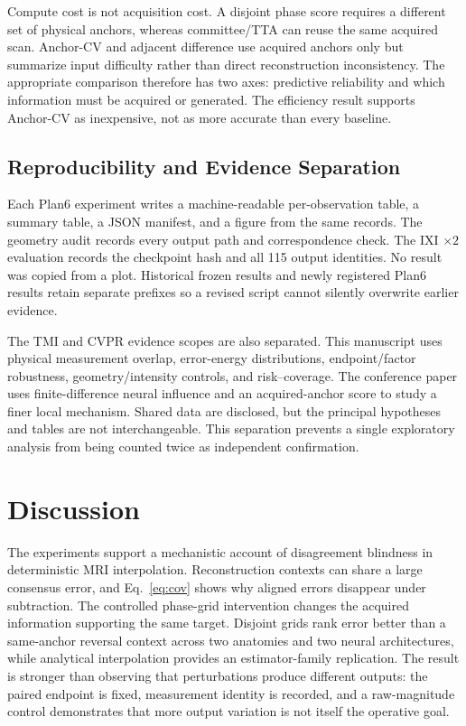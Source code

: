 \documentclass[journal,10pt]{IEEEtran}
\begin{document}
Compute cost is not acquisition cost. A disjoint phase score requires a different set of physical anchors, whereas committee/TTA can reuse the same acquired scan. Anchor-CV and adjacent difference use acquired anchors only but summarize input difficulty rather than direct reconstruction inconsistency. The appropriate comparison therefore has two axes: predictive reliability and which information must be acquired or generated. The efficiency result supports Anchor-CV as inexpensive, not as more accurate than every baseline.

\subsection{Reproducibility and Evidence Separation}
Each Plan6 experiment writes a machine-readable per-observation table, a summary table, a JSON manifest, and a figure from the same records. The geometry audit records every output path and correspondence check. The IXI $\times2$ evaluation records the checkpoint hash and all 115 output identities. No result was copied from a plot. Historical frozen results and newly registered Plan6 results retain separate prefixes so a revised script cannot silently overwrite earlier evidence.

The TMI and CVPR evidence scopes are also separated. This manuscript uses physical measurement overlap, error-energy distributions, endpoint/factor robustness, geometry/intensity controls, and risk--coverage. The conference paper uses finite-difference neural influence and an acquired-anchor score to study a finer local mechanism. Shared data are disclosed, but the principal hypotheses and tables are not interchangeable. This separation prevents a single exploratory analysis from being counted twice as independent confirmation.

\section{Discussion}
The experiments support a mechanistic account of disagreement blindness in deterministic MRI interpolation. Reconstruction contexts can share a large consensus error, and Eq.~\eqref{eq:cov} shows why aligned errors disappear under subtraction. The controlled phase-grid intervention changes the acquired information supporting the same target. Disjoint grids rank error better than a same-anchor reversal context across two anatomies and two neural architectures, while analytical interpolation provides an estimator-family replication. The result is stronger than observing that perturbations produce different outputs: the paired endpoint is fixed, measurement identity is recorded, and a raw-magnitude control demonstrates that more output variation is not itself the operative goal.
\end{document}

